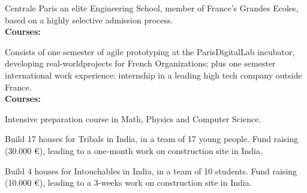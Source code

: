 



\small{Centrale Paris an elite Engineering School, member of France’s Grandes Ecoles, based on a highly selective admission process.\\}
{\textbf{Courses:}} \footnotesize{    }

\divider

\small{Consists of one semester of agile prototyping at the ParisDigitalLab incubator, developing real-worldprojects for French Organizations; plus one semester international work experience: internship in a leading high tech company outside France.\\}
{\textbf{Courses:}} \footnotesize{  }

\divider

\small{Intensive preparation course in Math, Physics and Computer Science.}

\divider





\small{Build 17 houses for Tribals in India, in a team of 17 young people.
Fund raising (30.000 €), leading to a one-month work on construction site in India.}

\divider


\small{Build 4 houses for Intouchables in India, in a team of 10 students.
Fund raising (10.000 €), leading to a 3-weeks work on construction site in India.}






